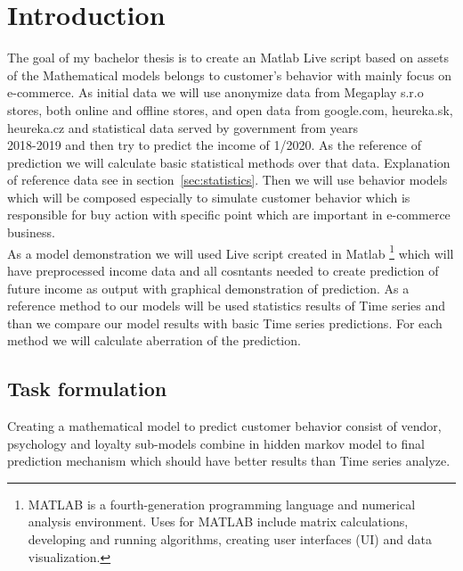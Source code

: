 
{}

\chapter*{Introduction}

The goal of my bachelor thesis is to create an Matlab Live script based on assets of the Mathematical models belongs to customer's behavior with mainly focus on e-commerce.
As initial data we will use anonymize data from Megaplay s.r.o stores, both online and offline stores, and open data from
google.com, heureka.sk, heureka.cz and statistical data served by government from years\\ 2018-2019 and then try to predict the income of 1/2020.
As the reference of prediction we will calculate basic statistical methods over that data. Explanation of reference data see in section~\ref{sec:statistics}.
Then we will use behavior models which will be composed especially to simulate customer behavior which is responsible for
buy action with specific point which are important in e-commerce business.\\
As a model demonstration we will used Live script created in Matlab \footnote{MATLAB is a fourth-generation programming
language and numerical analysis environment.
Uses for MATLAB include matrix calculations, developing and running algorithms, creating user interfaces (UI) and data visualization.}
which will have preprocessed income data and all cosntants needed to create prediction of future income
as output with graphical demonstration of prediction.
As a reference method to our models will be used statistics results of Time series and than we compare our model results with basic Time series predictions. For each method we will calculate aberration of the prediction.

\section*{Task formulation}

Creating a mathematical model to predict customer behavior consist of vendor, psychology and loyalty sub-models combine in hidden markov model to final prediction mechanism which should have better results than Time series analyze.
